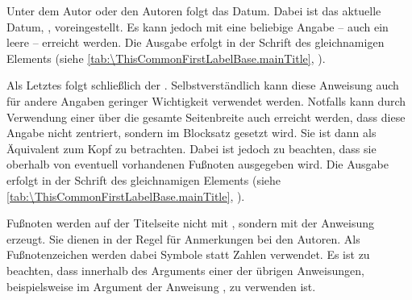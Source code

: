 \BeginIndexGroup{}%
Unter dem Autor oder den Autoren folgt das
Datum.  Dabei ist das aktuelle Datum,
, voreingestellt. Es kann jedoch mit 
eine beliebige Angabe -- auch ein leere -- erreicht werden. Die Ausgabe
erfolgt in der Schrift des gleichnamigen
Elements (siehe \autoref{tab:\ThisCommonFirstLabelBase.mainTitle},
).%
\EndIndexGroup

\BeginIndexGroup{}%
%
Als Letztes folgt schließlich der
. Selbstverständlich kann diese
Anweisung auch für andere Angaben geringer Wichtigkeit verwendet
werden. Notfalls kann durch Verwendung einer  über die gesamte
Seitenbreite auch erreicht werden, dass diese Angabe nicht zentriert, sondern
im Blocksatz gesetzt wird. Sie ist dann als Äquivalent zum Kopf zu
betrachten. Dabei ist jedoch zu beachten, dass sie oberhalb von eventuell
vorhandenen Fußnoten ausgegeben wird. Die Ausgabe erfolgt in der
Schrift des gleichnamigen Elements (siehe
\autoref{tab:\ThisCommonFirstLabelBase.mainTitle},
).%
\EndIndexGroup

Fußnoten werden auf der
Titelseite nicht mit , sondern mit
der Anweisung  erzeugt. Sie dienen in der Regel für Anmerkungen
bei den Autoren. Als Fußnotenzeichen werden dabei Symbole statt Zahlen
verwendet. Es ist zu beachten, dass 
innerhalb des Arguments einer der übrigen Anweisungen, beispielsweise im
Argument  der Anweisung , zu verwenden ist. %
%

